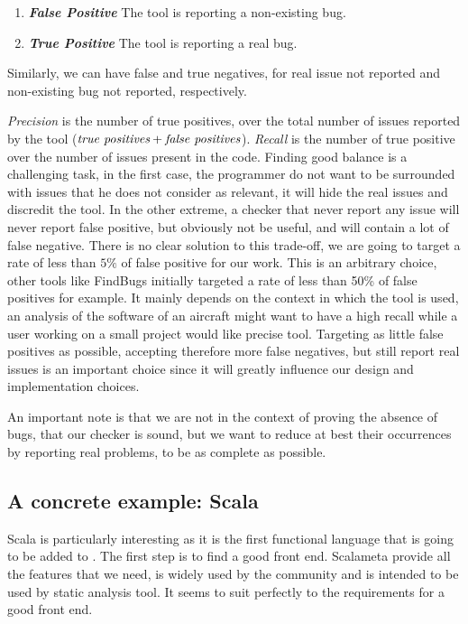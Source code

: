 \begin{enumerate}
	\item \textbf{\textit{False Positive}} \newline The tool is reporting a non-existing bug.
	\item \textbf{\textit{True Positive}} \newline The tool is reporting a real bug. 
\end{enumerate}
Similarly, we can have false and true negatives, for real issue not reported and non-existing bug not reported, respectively. 

\emph{Precision} is the number of true positives, over the total number of issues reported by the tool ($ \emph{true positives} + \emph{false positives} $). \emph{Recall} is the number of true positive over the number of issues present in the code. 
Finding good balance is a challenging task, in the first case, the programmer do not want to be surrounded with issues that he does not consider as relevant, it will hide the real issues and discredit the tool. 
In the other extreme, a checker that never report any issue will never report false positive, but obviously not be useful, and will contain a lot of false negative. 
There is no clear solution to this trade-off, we are going to target a rate of less than $5\%$ of false positive for our work.
This is an arbitrary choice, other tools like FindBugs \cite{Hovemeyer:2004:FBE:1052883.1052895} initially targeted a rate of less than 50\% of false positives for example. 
It mainly depends on the context in which the tool is used, an analysis of the software of an aircraft might want to have a high recall while a user working on a small project would like precise tool. 
Targeting as little false positives as possible, accepting therefore more false negatives, but still report real issues is an important choice since it will greatly influence our design and implementation choices.

An important note is that we are not in the context of proving the absence of bugs, that our checker is sound, but we want to reduce at best their occurrences by reporting real problems, to be as complete as possible.

\subsection{A concrete example: Scala}
\label{subsec:concrete_example}

Scala is particularly interesting as it is the first functional language that is going to be added to \slang{}.
The first step is to find a good front end.
Scalameta \cite{Scalameta:2019:Online} provide all the features that we need, is widely used by the community and is intended to be used by static analysis tool. 
It seems to suit perfectly to the requirements for a good front end.

